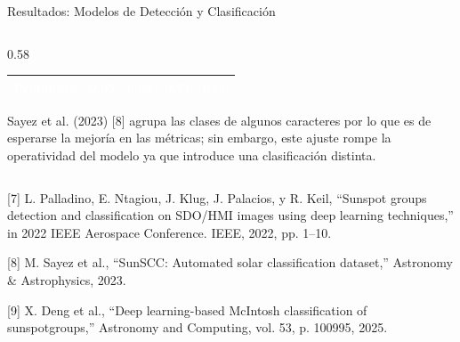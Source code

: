 \documentclass[aspectratio=169]{beamer}
\begin{document}
\begin{frame}{Resultados: Modelos de Detección y Clasificación}
\begin{columns}[c, onlytextwidth]
\begin{column}{0.58\textwidth}
\begin{table}
\begin{tabular}{lcccc}
                    \cellcolor{azulPropuesta}\textcolor{white}{\textbf{Propuesta}} & 
                    \cellcolor{azulPropuesta}\textcolor{white}{\textbf{0.65}} & 
                    \cellcolor{azulPropuesta}\textcolor{white}{\textbf{0.63}} & 
                    \cellcolor{azulPropuesta}\textcolor{white}{\textbf{0.71}} & 
                    \cellcolor{azulPropuesta}\textcolor{white}{\textbf{0.66}} \\
                    \bottomrule
                \end{tabular}
            \end{table}

            \vspace{0.15cm}

            \scriptsize
            Sayez et al. (2023) [8] agrupa las clases de algunos caracteres por lo que es de esperarse la mejoría en las métricas; sin embargo, este ajuste rompe la operatividad del modelo ya que introduce una clasificación distinta.
            
        \end{column}
        
    \end{columns}

    \vfill

    {\raggedright\tiny\color{gray}
    [7] L. Palladino, E. Ntagiou, J. Klug, J. Palacios, y R. Keil, “Sunspot groups detection and classification on SDO/HMI images using deep learning techniques,” in 2022 IEEE Aerospace Conference. IEEE, 2022, pp. 1–10. \par\vspace{0.03cm}
    [8] M. Sayez et al., “SunSCC: Automated solar classification dataset,” Astronomy \& Astrophysics, 2023. \par\vspace{0.03cm}
    [9] X. Deng et al., “Deep learning-based McIntosh classification of sunspotgroups,” Astronomy and Computing, vol. 53, p. 100995, 2025.\par}
\end{frame}
\end{document}
